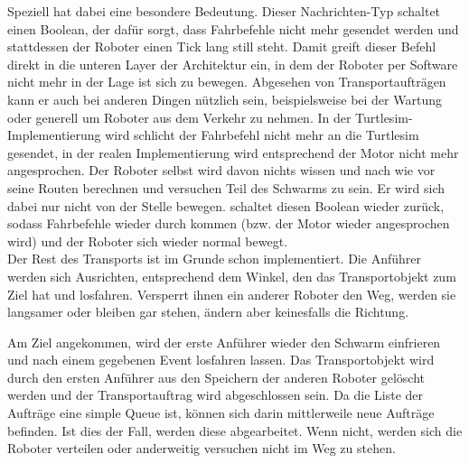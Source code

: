 Speziell  hat dabei eine besondere Bedeutung. Dieser Nachrichten-Typ schaltet einen Boolean, der dafür sorgt, dass Fahrbefehle nicht mehr gesendet werden und stattdessen der Roboter einen Tick lang still steht. Damit greift dieser Befehl direkt in die unteren Layer der Architektur ein, in dem der Roboter per Software nicht mehr in der Lage ist sich zu bewegen. Abgesehen von Transportaufträgen kann er auch bei anderen Dingen nützlich sein, beispielsweise bei der Wartung oder generell um Roboter aus dem Verkehr zu nehmen. In der Turtlesim-Implementierung wird schlicht der Fahrbefehl nicht mehr an die Turtlesim gesendet, in der realen Implementierung wird entsprechend der Motor nicht mehr angesprochen. Der Roboter selbst wird davon nichts wissen und nach wie vor seine Routen berechnen und versuchen Teil des Schwarms zu sein. Er wird sich dabei nur nicht von der Stelle bewegen.  schaltet diesen Boolean wieder zurück, sodass Fahrbefehle wieder durch kommen (bzw. der Motor wieder angesprochen wird) und der Roboter sich wieder normal bewegt.\\

Der Rest des Transports ist im Grunde schon implementiert. Die Anführer werden sich Ausrichten, entsprechend dem Winkel, den das Transportobjekt zum Ziel hat und losfahren. Versperrt ihnen ein anderer Roboter den Weg, werden sie langsamer oder bleiben gar stehen, ändern aber keinesfalls die Richtung.

Am Ziel angekommen, wird der erste Anführer wieder den Schwarm einfrieren und nach einem gegebenen Event losfahren lassen. Das Transportobjekt wird durch den ersten Anführer aus den Speichern der anderen Roboter gelöscht werden und der Transportauftrag wird abgeschlossen sein. Da die Liste der Aufträge eine simple Queue ist, können sich darin mittlerweile neue Aufträge befinden. Ist dies der Fall, werden diese abgearbeitet. Wenn nicht, werden sich die Roboter verteilen oder anderweitig versuchen nicht im Weg zu stehen.




